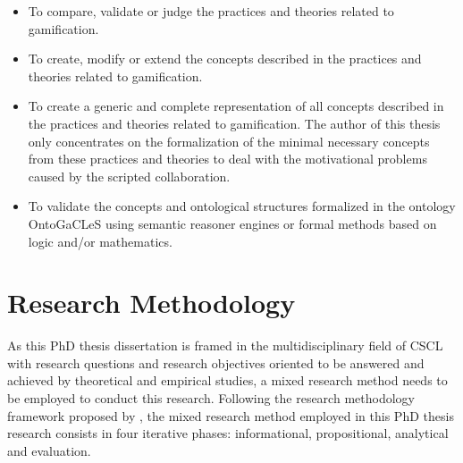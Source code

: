 \begin{itemize}
\item
To compare, validate or judge the practices and theories related to gamification.

\item
To create, modify or extend the concepts described in the practices and theories related to gamification.

\item
To create a generic and complete representation of all concepts described in the practices and theories related to gamification. The author of this thesis only concentrates on the formalization of the minimal necessary concepts from these practices and theories to deal with the motivational problems caused by the scripted collaboration.

\item
To validate the concepts and ontological structures formalized in the ontology OntoGaCLeS using semantic reasoner engines or formal methods based on logic and/or mathematics.
\end{itemize}

\section{Research Methodology}
\label{sec:research-methodology}

As this PhD thesis dissertation is framed in the multidisciplinary field of CSCL with research questions and research objectives oriented to be answered and achieved by theoretical and empirical studies, a mixed research method needs to be employed to conduct this research. Following the research methodology framework proposed by , the mixed research method employed in this PhD thesis research consists in four iterative phases: informational, propositional, analytical and evaluation.


